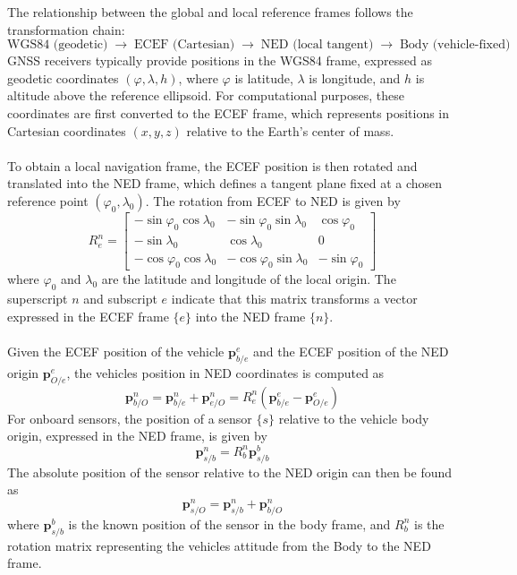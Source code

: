 \noindent
The relationship between the global and local reference frames follows the transformation chain:
$$
    \text{WGS84 (geodetic)} \;\rightarrow\; \text{ECEF (Cartesian)} \;\rightarrow\; \text{NED (local tangent)} \;\rightarrow\; \text{Body (vehicle-fixed)}
$$
GNSS receivers typically provide positions in the WGS84 frame, expressed as geodetic coordinates $(\varphi, \lambda, h)$, where $\varphi$ is latitude, $\lambda$ is longitude, and $h$ is altitude above the reference ellipsoid. For computational purposes, these coordinates are first converted to the ECEF frame, which represents positions in Cartesian coordinates $(x, y, z)$ relative to the Earth's center of mass.  
\\ \\
To obtain a local navigation frame, the ECEF position is then rotated and translated into the NED frame, which defines a tangent plane fixed at a chosen reference point $(\varphi_0, \lambda_0)$. The rotation from ECEF to NED is given by
$$
    R_{e}^{n} =
    \begin{bmatrix}
        -\sin\varphi_0\cos\lambda_0 & -\sin\varphi_0\sin\lambda_0 & \cos\varphi_0 \\
        -\sin\lambda_0 & \cos\lambda_0 & 0 \\
        -\cos\varphi_0\cos\lambda_0 & -\cos\varphi_0\sin\lambda_0 & -\sin\varphi_0
    \end{bmatrix}
$$
where $\varphi_0$ and $\lambda_0$ are the latitude and longitude of the local origin. The superscript $n$ and subscript $e$ indicate that this matrix transforms a vector expressed in the ECEF frame $\{e\}$ into the NED frame $\{n\}$.  
\\ \\
Given the ECEF position of the vehicle $\mathbf{p}_{b/e}^{e}$ and the ECEF position of the NED origin $\mathbf{p}_{O/e}^{e}$, the vehicles position in NED coordinates is computed as
$$
    \mathbf{p}_{b/O}^{n} = \mathbf{p}_{b/e}^{n} + \mathbf{p}_{e/O}^{n} = R_e^n (\mathbf{p}_{b/e}^{e} - \mathbf{p}_{O/e}^{e})
$$
For onboard sensors, the position of a sensor $\{s\}$ relative to the vehicle body origin, expressed in the NED frame, is given by
$$
\mathbf{p}_{s/b}^{n} = R_b^n \mathbf{p}_{s/b}^{b}
$$
The absolute position of the sensor relative to the NED origin can then be found as
$$
\mathbf{p}_{s/O}^{n} = \mathbf{p}_{s/b}^{n} + \mathbf{p}_{b/O}^{n}
$$
where $\mathbf{p}_{s/b}^{b}$ is the known position of the sensor in the body frame, and $R_b^n$ is the rotation matrix representing the vehicles attitude from the Body to the NED frame.
